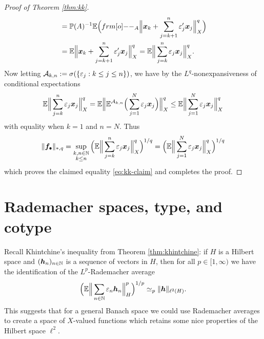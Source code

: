 \begin{proof}[Proof of Theorem \ref{thm:kk}]
\begin{equation*}
\begin{aligned}
      &=  \P(A)^{-1} \E \Big( \1_{A} \Big\|\mb{x}_k + \sum_{j=k+1}^{n} \varepsilon_{j}^{\prime} \mb{x}_j \Big\|_{X}^{q} \Big) \\
      &=  \E \Big\|\mb{x}_k + \sum_{j=k+1}^{n} \varepsilon_{j}^{\prime} \mb{x}_j \Big\|_{X}^{q} 
      =  \E  \Big\|\sum_{j=k}^{n} \varepsilon_{j} \mb{x}_j \Big\|_{X}^{q}. \\
    \end{aligned}
  \end{equation*}
  Now letting $\mathcal{A}_{k,n} := \sigma(\{\varepsilon_j : k \leq j \leq n\})$, we have by the $L^q$-nonexpansiveness of conditional expectations
  \begin{equation*}
    \mathbb{E} \Big\|\sum_{j=k}^{n} \varepsilon_{j} \bm{x}_j \Big\|_{X}^{q}
    = \mathbb{E} \Big\|\mathbb{E}^{\mathcal{A}_{k,n}} \Big(\sum_{j=1}^{N} \varepsilon_{j} \bm{x}_j \Big)\Big\|_{X}^{q}
    \leq \mathbb{E} \Big\|\sum_{j=1}^{N} \varepsilon_{j} \bm{x}_j \Big\|_{X}^{q}
  \end{equation*}
  with equality when $k=1$ and $n=N$.
  Thus
  \begin{equation*}
    \|\bm{f}_{\bullet}\|_{*,q} =  \sup_{\substack{k,n \in \mathbb{N} \\ k \leq n}}  \Big(\mathbb{E}  \Big\|\sum_{j=k}^{n} \varepsilon_{j} \bm{x}_j \Big\|_{X}^{q}\Big)^{1/q} = \Big(\mathbb{E}  \Big\|\sum_{j=1}^{N} \varepsilon_{j} \bm{x}_j \Big\|_{X}^{q}\Big)^{1/q}
  \end{equation*}
  which proves the claimed equality \eqref{eq:kk-claim} and completes the proof. 
\end{proof}

\section{Rademacher spaces, type, and cotype}

Recall Khintchine's inequality from Theorem \ref{thm:khintchine}: if $H$ is a Hilbert space and $(\bm{h}_{n})_{n \in \mathbb{N}}$ is a sequence of vectors in $H$, then for all $p \in [1,\infty)$ we have the identification of the $L^p$-Rademacher average
\begin{equation*}
  \Big( \mathbb{E} \Big\| \sum_{n \in \mathbb{N}} \varepsilon_{n} \bm{h}_{n} \Big\|_{H}^{p} \Big)^{1/p} \simeq_{p} \|\bm{h}\|_{\ell^2(H)}.
\end{equation*}
This suggests that for a general Banach space we could use Rademacher averages to create a space of $X$-valued functions which retains some nice properties of the Hilbert space $\ell^2$.

